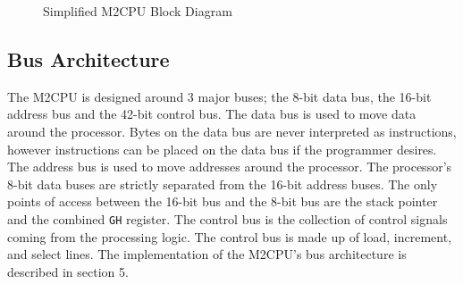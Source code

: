\documentclass[a4paper,12pt]{article}
\newcommand{\mt}{M2CPU}
\newcommand{\ibusnum}{42}
\newcommand{\Gr}{\texttt{G}}
\newcommand{\Hr}{\texttt{H}}
\begin{document}
\newpage
\thispagestyle{empty}
\begin{landscape}
	\begin{figure}
	\caption{Simplified \mt{} Block Diagram}
	\end{figure}
\end{landscape}

\newpage
\subsection{Bus Architecture}
The \mt{} is designed around 3 major buses; the 8-bit data bus, the 16-bit 
address bus and the \ibusnum{}-bit control bus. The data bus is used to move 
data around the processor. Bytes on the data bus are never interpreted as 
instructions, however instructions can be placed on the data bus if the 
programmer desires. The address bus is used to move addresses around the 
processor. The processor's 8-bit data buses are strictly separated from the 
16-bit address buses. The only points of access between the 16-bit bus and the 
8-bit bus are the stack pointer and the combined \Gr{}\Hr{} register. The 
control bus is the collection of control signals coming from the processing 
logic. The control bus is made up of load, increment, and select lines. The 
implementation of the \mt{}'s bus architecture is described in section 5.
\par
\end{document}
